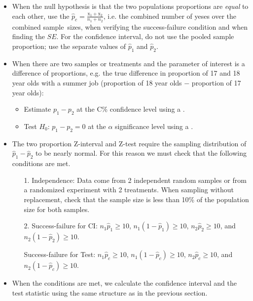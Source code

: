 \begin{itemize}
\item When the null hypothesis is that the two populations proportions are \textit{equal} to each other, use the  $\hat{p}_c=\frac{\text{x}_1+\text{x}_2}{n_1+n_2}$, i.e. the combined number of yeses over the combined sample~sizes, when verifying the success-failure condition and when finding the $SE$.  For the confidence interval, do not use the pooled sample proportion; use the separate values of  $\hat{p}_1$ and $\hat{p}_2$.  
\item When there are two samples or treatments and the parameter of interest is a difference of proportions, e.g. the true difference in proportion of 17 and 18 year olds with a summer job (proportion of 18 year olds $-$ proportion of 17 year olds): 
\begin{itemize}
\setlength{\itemsep}{0mm}
\item Estimate $p_1-p_2$ at the C\% confidence level using a .
\item Test $H_0$: $p_1-p_2=0$ at the $\alpha$ significance level using a .
\end{itemize}
\item The two proportion Z-interval and Z-test require the sampling distribution of $\hat{p}_1-\hat{p}_2$ to be nearly normal.  For this reason we must check that the following conditions are met.   \vspace{-1mm}
\begin{itemize}
\item[1.] Independence:  Data come from 2 independent random samples or from a randomized experiment with 2 treatments.  When sampling without replacement, check that the sample size is less than 10\% of the population size for both samples.
\item[2.] Success-failure for CI:  $n_1\hat{p}_1\ge 10$, $n_1(1-\hat{p}_1)\ge 10$, $n_2\hat{p}_2\ge 10$, and $n_2(1-\hat{p}_2)\ge 10$. 
\item[] Success-failure for Test: $n_1\hat{p}_c\ge 10$, $n_1(1-\hat{p}_c)\ge 10$, $n_2\hat{p}_c\ge 10$, and $n_2(1-\hat{p}_c)\ge 10$.
\end{itemize}

\item When the conditions are met, we calculate the confidence interval and the test statistic using the same structure as in the previous section.  


\end{itemize}
